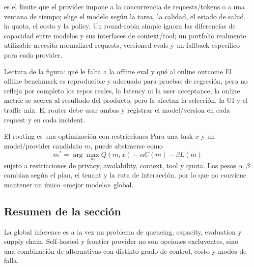  es el límite que el provider impone a la concurrencia de requests/tokens o a una ventana de tiempo;  elige el modelo según la tarea, la calidad, el estado de salud, la quota, el costo y la policy. Un round-robin simple ignora las diferencias de capacidad entre modelos y sus interfaces de context/tool; un portfolio realmente utilizable necesita normalized requests, versioned evals y un fallback específico para cada provider.


\begin{knowledgebox}{Lectura de la figura: qué le falta a la offline eval y qué al online outcome}
El offline benchmark es reproducible y adecuado para pruebas de regresión, pero no refleja por completo los repos reales, la latency ni la user acceptance; la online metric se acerca al resultado del producto, pero la afectan la selección, la UI y el traffic mix. El router debe usar ambas y registrar el model/version en cada request y en cada incident.
\end{knowledgebox}

\begin{importantbox}{El routing es una optimización con restricciones}
Para una task $x$ y un model/provider candidato $m$, puede abstraerse como
\[
m^*=\arg\max_m Q(m,x)-\alpha C(m)-\beta L(m)
\]
sujeto a restricciones de privacy, availability, context, tool y quota. Los pesos $\alpha,\beta$ cambian según el plan, el tenant y la ruta de interacción, por lo que no conviene mantener un único «mejor modelo» global.
\end{importantbox}


\subsection{Resumen de la sección}

La global inference es a la vez un problema de queueing, capacity, evaluation y supply chain. Self-hosted y frontier provider no son opciones excluyentes, sino una combinación de alternativas con distinto grado de control, costo y modos de falla.
